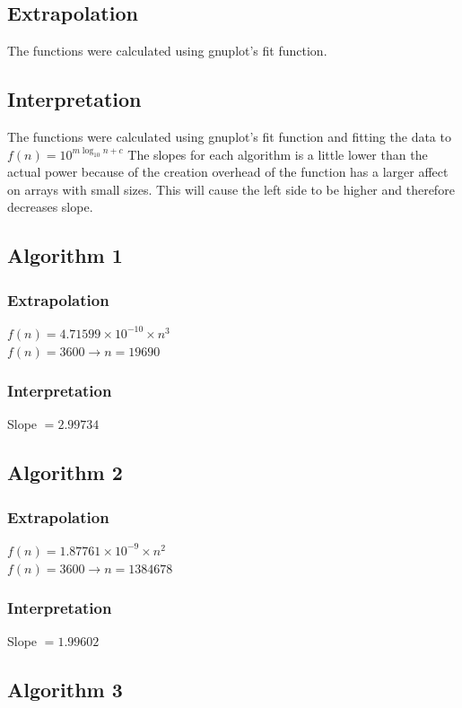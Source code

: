 \documentclass[a4paper,10pt]{article}
\begin{document}
		\subsection{Extrapolation}
			The functions were calculated using gnuplot's fit function.

		\subsection{Interpretation}
			The functions were calculated using gnuplot's fit function and fitting the data to $f(n) = 10^{m \log_{10}n+c}$
			The slopes for each algorithm is a little lower than the actual power because of the creation overhead of the function has a larger affect on arrays with small sizes.  This will cause the left side to be higher and therefore decreases slope.

		\subsection{Algorithm 1}
			\subsubsection{Extrapolation}
				$f(n) = 4.71599 \times 10^{-10} \times n^3$\\
				$f(n) = 3600 \to n = \boxed{19690}$
			\subsubsection{Interpretation}
				Slope $= \boxed{2.99734}$
		
		\subsection{Algorithm 2}
			\subsubsection{Extrapolation}
				$f(n) = 1.87761 \times 10^{-9} \times n^2$\\
				$f(n) = 3600 \to n = \boxed{1384678}$
			\subsubsection{Interpretation}
				Slope $= \boxed{1.99602}$

		\subsection{Algorithm 3}
\end{document}
